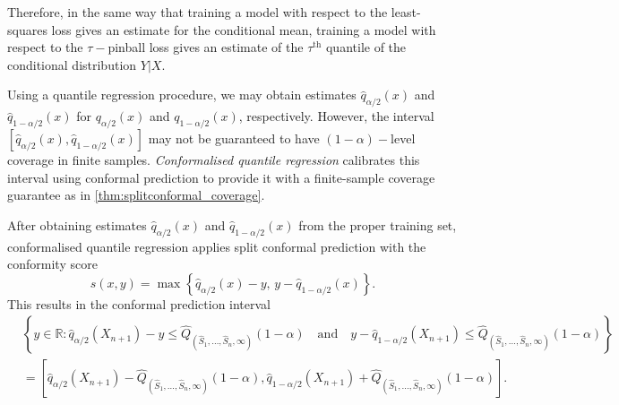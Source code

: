 \documentclass[11pt, titlepage]{article} %
\newcommand{\R}{\mathrm}
\numberwithin{equation}{section}
\theoremstyle{definition}
\numberwithin{theorem}{section}
\numberwithin{lemma}{section}
\numberwithin{corollary}{section}
\numberwithin{proposition}{section}
\numberwithin{definition}{section}
\numberwithin{remark}{section}
\begin{document}
\noindent
Therefore, in the same way that training a model with respect to the least-squares loss gives an estimate for the conditional mean, training a model with respect to the \(\tau-\)pinball loss gives an estimate of the \(\tau^{\R{th}}\) quantile of the conditional distribution \(Y|X\). \vskip5pt

\noindent
Using a quantile regression procedure, we may obtain estimates \(\hat{q}_{\alpha/2}(x)\) and \(\hat{q}_{1-\alpha/2}(x)\) for \(q_{\alpha/2}(x)\) and \(q_{1-\alpha/2}(x)\), respectively. However, the interval \([\hat{q}_{\alpha/2}(x), \hat{q}_{1-\alpha/2}(x)]\) may not be guaranteed to have \((1-\alpha)-\)level coverage in finite samples. \textit{Conformalised quantile regression} \cite{romano2019_CQR} calibrates this interval using conformal prediction to provide it with a finite-sample coverage guarantee as in \cref{thm:splitconformal_coverage}. \vskip5pt

\noindent
After obtaining estimates \(\hat{q}_{\alpha/2}(x)\) and \(\hat{q}_{1-\alpha/2}(x)\) from the proper training set, conformalised quantile regression applies split conformal prediction with the conformity score \begin{equation}
    \hat{s}(x,y) = \max\left\{ \hat{q}_{\alpha/2}(x) - y, \, y - \hat{q}_{1-\alpha/2}(x) \right\}.
\label{eqn:CQR_conformity_score}
\end{equation} This results in the conformal prediction interval \begin{align}
    &\left\{ y \in \mathbb{R}: \hat{q}_{\alpha/2}(X_{n+1}) - y \leq \hat{Q}_{(\hat{S}_1, \ldots, \hat{S}_n, \infty)}(1-\alpha) \quad \R{and} \quad y - \hat{q}_{1-\alpha/2}(X_{n+1}) \leq \hat{Q}_{(\hat{S}_1, \ldots, \hat{S}_n, \infty)}(1-\alpha) \right\} \nonumber \\
    &= \left[\hat{q}_{\alpha/2}(X_{n+1}) - \hat{Q}_{(\hat{S}_1, \ldots, \hat{S}_n, \infty)}(1-\alpha), \hat{q}_{1-\alpha/2}(X_{n+1}) + \hat{Q}_{(\hat{S}_1, \ldots, \hat{S}_n, \infty)}(1-\alpha)  \right].
\end{align}
\end{document}
